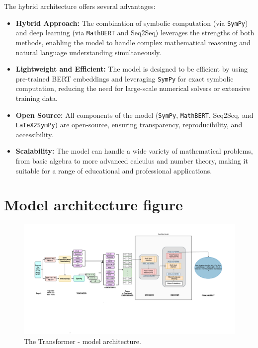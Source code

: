 \documentclass{article}
\begin{document}
The hybrid architecture offers several advantages:

\begin{itemize}
    \item \textbf{Hybrid Approach:} The combination of symbolic computation (via \texttt{SymPy}) and deep learning (via \texttt{MathBERT} and Seq2Seq) leverages the strengths of both methods, enabling the model to handle complex mathematical reasoning and natural language understanding simultaneously.
    \item \textbf{Lightweight and Efficient:} The model is designed to be efficient by using pre-trained BERT embeddings and leveraging \texttt{SymPy} for exact symbolic computation, reducing the need for large-scale numerical solvers or extensive training data.
    \item \textbf{Open Source:} All components of the model (\texttt{SymPy}, \texttt{MathBERT}, Seq2Seq, and \texttt{LaTeX2SymPy}) are open-source, ensuring transparency, reproducibility, and accessibility.
    \item \textbf{Scalability:} The model can handle a wide variety of mathematical problems, from basic algebra to more advanced calculus and number theory, making it suitable for a range of educational and professional applications.
\end{itemize}


\section{Model architecture figure}


\begin{figure}[H]
  \centering
  \includegraphics[scale=0.2]{./figures/Model_architecture_figure.png}
  \caption{The Transformer - model architecture.}
  \label{fig:model-arch}
\end{figure}
\end{document}
